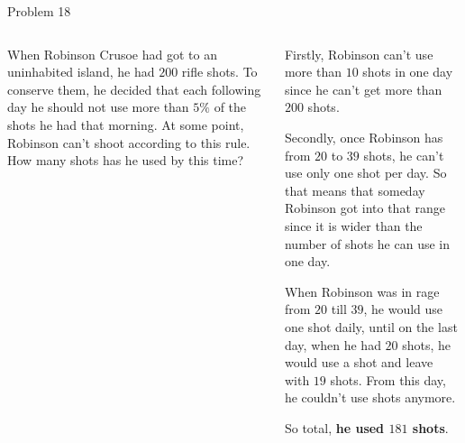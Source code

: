 \documentclass[9pt,aspectratio=169]{beamer}
\begin{document}
\begin{frame}{Problem 18}
  \begin{columns}[T]
    \begin{column}{0.5\textwidth}
      \begin{problem}
        When Robinson Crusoe had got to an uninhabited island, he had $200$ rifle shots. To conserve them, he decided that each following day he should not use more than $5\%$ of the shots he had that morning. At some point, Robinson can't shoot according to this rule. How many shots has he used by this time?
      \end{problem}
      
    \end{column}
    \begin{column}{0.5\textwidth}
      Firstly, Robinson can't use more than $10$ shots in one day since he can't get more than $200$ shots. 

      Secondly, once Robinson has from $20$ to $39$ shots, he can't use only one shot per day. So that means that someday Robinson got into that range since it is wider than the number of shots he can use in one day.
      
      When Robinson was in rage from $20$ till $39$, he would use one shot daily, until on the last day, when he had $20$ shots, he would use a shot and leave with $19$ shots. From this day, he couldn't use shots anymore. 
      
      So total, \textbf{he used $181$ shots}.
    \end{column}
  \end{columns}
\end{frame}
\end{document}

